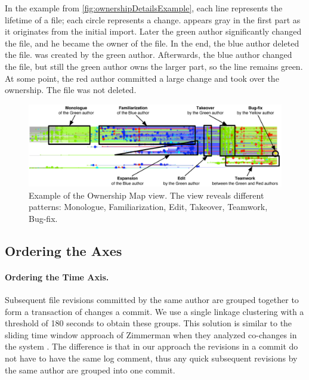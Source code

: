 In the example from \autoref{fig:ownershipDetailsExample}, each line represents the lifetime of a file; each circle represents a change.  appears gray in the first part as it originates from the initial import. Later the green author significantly changed the file, and he became the owner of the file. In the end, the blue author deleted the file.  was created by the green author. Afterwards, the blue author changed the file, but still the green author owns the larger part, so the line remains green. At some point, the red author committed a large change and took over the ownership. The file was not deleted.

\begin{figure}[hbt]
\begin{center}
\includegraphics[width=\linewidth]{fig/hapax-owners-map-example}
\caption{Example of the Ownership Map view. The view reveals different patterns:
Monologue, Familiarization, Edit, Takeover, Teamwork, Bug-fix.}
\label{fig:ownershipMapExample}
\end{center}
\end{figure}

\subsection{Ordering the Axes}

\paragraph{Ordering the Time Axis.}
Subsequent file revisions committed by the same author are grouped together to form a transaction of changes \ie a commit. We use a single linkage clustering with a threshold of 180 seconds to obtain these groups. This solution is similar to the sliding time window approach of Zimmerman \etal when they analyzed co-changes in the system \cite{Zimm04a}. The difference is that in our approach the revisions in a commit do not have to have the same log comment, thus any quick subsequent revisions by the same author are grouped into one commit.

